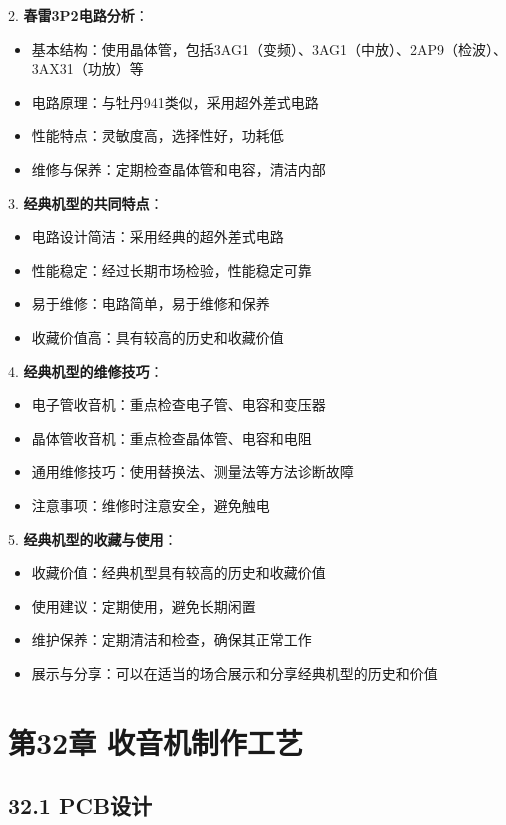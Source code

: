 \documentclass[12pt,UTF8]{ctexbook}
\begin{document}
2. \textbf{春雷3P2电路分析}：
   \begin{itemize}[leftmargin=3.5em]
   \item 基本结构：使用晶体管，包括3AG1（变频）、3AG1（中放）、2AP9（检波）、3AX31（功放）等
   \item 电路原理：与牡丹941类似，采用超外差式电路
   \item 性能特点：灵敏度高，选择性好，功耗低
   \item 维修与保养：定期检查晶体管和电容，清洁内部
   \end{itemize}

3. \textbf{经典机型的共同特点}：
   \begin{itemize}[leftmargin=3.5em]
   \item 电路设计简洁：采用经典的超外差式电路
   \item 性能稳定：经过长期市场检验，性能稳定可靠
   \item 易于维修：电路简单，易于维修和保养
   \item 收藏价值高：具有较高的历史和收藏价值
   \end{itemize}

4. \textbf{经典机型的维修技巧}：
   \begin{itemize}[leftmargin=3.5em]
   \item 电子管收音机：重点检查电子管、电容和变压器
   \item 晶体管收音机：重点检查晶体管、电容和电阻
   \item 通用维修技巧：使用替换法、测量法等方法诊断故障
   \item 注意事项：维修时注意安全，避免触电
   \end{itemize}

5. \textbf{经典机型的收藏与使用}：
   \begin{itemize}[leftmargin=3.5em]
   \item 收藏价值：经典机型具有较高的历史和收藏价值
   \item 使用建议：定期使用，避免长期闲置
   \item 维护保养：定期清洁和检查，确保其正常工作
   \item 展示与分享：可以在适当的场合展示和分享经典机型的历史和价值
   \end{itemize}

\chapter*{第32章 收音机制作工艺}
\section*{32.1 PCB设计}
\end{document}
